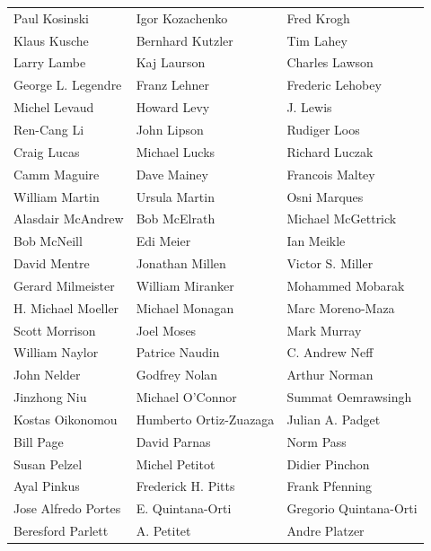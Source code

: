 \begin{tabular}{lll}
Paul Kosinski          & Igor Kozachenko        & Fred Krogh\\
Klaus Kusche           & Bernhard Kutzler       & Tim Lahey\\
Larry Lambe            & Kaj Laurson            & Charles Lawson\\
George L. Legendre     & Franz Lehner           & Frederic Lehobey\\
Michel Levaud          & Howard Levy            & J. Lewis\\
Ren-Cang Li            & John Lipson            & Rudiger Loos\\
Craig Lucas            & Michael Lucks          & Richard Luczak\\
Camm Maguire           & Dave Mainey            & Francois Maltey\\
William Martin         & Ursula Martin          & Osni Marques\\
Alasdair McAndrew      & Bob McElrath           & Michael McGettrick\\
Bob McNeill            & Edi Meier              & Ian Meikle\\
David Mentre           & Jonathan Millen        & Victor S. Miller\\
Gerard Milmeister      & William Miranker       & Mohammed Mobarak\\
H. Michael Moeller     & Michael Monagan        & Marc Moreno-Maza\\
Scott Morrison         & Joel Moses             & Mark Murray\\
William Naylor         & Patrice Naudin         & C. Andrew Neff\\
John Nelder            & Godfrey Nolan          & Arthur Norman\\
Jinzhong Niu           & Michael O'Connor       & Summat Oemrawsingh\\
Kostas Oikonomou       & Humberto Ortiz-Zuazaga & Julian A. Padget\\
Bill Page              & David Parnas           & Norm Pass\\
Susan Pelzel           & Michel Petitot         & Didier Pinchon\\
Ayal Pinkus            & Frederick H. Pitts     & Frank Pfenning\\
Jose Alfredo Portes    & E. Quintana-Orti       & Gregorio Quintana-Orti\\
Beresford Parlett      & A. Petitet             & Andre Platzer\\

\end{tabular}

